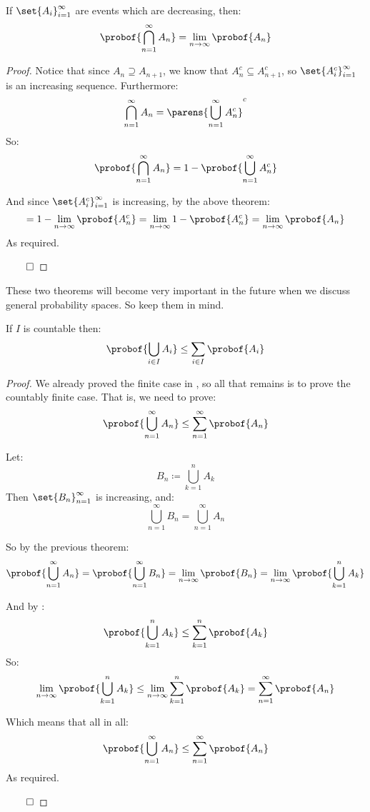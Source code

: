 \begin{coro*}[contProbCoro]

	If $\set{A_i}_{i=1}^\infty$ are events which are decreasing, then:
	\[ \probof{\bigcap_{n=1}^\infty A_n} = \lim_{n\to\infty}\probof{A_n} \]

\end{coro*}

\begin{proof}

	Notice that since $A_n\supseteq A_{n+1}$, we know that $A_n^c\subseteq A_{n+1}^c$, so $\set{A_i^c}_{i=1}^\infty$ is an
	increasing sequence.
	Furthermore:
	\[ \bigcap_{n=1}^\infty A_n = \parens{\bigcup_{n=1}^\infty A_n^c}^c \]
	So:
	\[ \probof{\bigcap_{n=1}^\infty A_n} = 1 - \probof{\bigcup_{n=1}^\infty A_n^c} \]

	And since $\set{A_i^c}_{i=1}^\infty$ is increasing, by the above theorem:
	\[ = 1 - \lim_{n\to\infty}\probof{A_n^c} = \lim_{n\to\infty} 1-\probof{A_n^c} = \lim_{n\to\infty}\probof{A_n} \]
	As required.

\hfill$\qed$

\end{proof}

\begin{note}

	These two theorems will become very important in the future when we discuss general probability spaces.
	So keep them in mind.

\end{note}

\newpage
\begin{thrm*}

	If $I$ is countable then:
	\[ \probof{\bigcup_{i\in I} A_i}\leq\sum_{i\in I}\probof{A_i} \]

\end{thrm*}

\begin{proof}

	We already proved the finite case in ,
	so all that remains is to prove the countably finite case.
	That is, we need to prove:
	\[ \probof{\bigcup_{n=1}^\infty A_n} \leq \sum_{n=1}^\infty\probof{A_n} \]

	Let:
	\[ B_n\coloneqq\bigcup_{k=1}^n A_k \]
	Then $\set{B_n}_{n=1}^\infty$ is increasing, and:
	\[ \bigcup_{n=1}^\infty B_n = \bigcup_{n=1}^\infty A_n \]

	So by the previous theorem:
	\[ \probof{\bigcup_{n=1}^\infty A_n} = \probof{\bigcup_{n=1}^\infty B_n} = \lim_{n\to\infty}\probof{B_n} =
	\lim_{n\to\infty}\probof{\bigcup_{k=1}^n A_k} \]

	And by :
	\[ \probof{\bigcup_{k=1}^n A_k}\leq\sum_{k=1}^n\probof{A_k} \]
	So:
	\[ \lim_{n\to\infty}\probof{\bigcup_{k=1}^n A_k}\leq\lim_{n\to\infty}\sum_{k=1}^n\probof{A_k} = \sum_{n=1}^\infty\probof{A_n} \]

	Which means that all in all:
	\[ \probof{\bigcup_{n=1}^\infty A_n} \leq \sum_{n=1}^\infty\probof{A_n} \]
	As required.

\hfill$\qed$

\end{proof}

